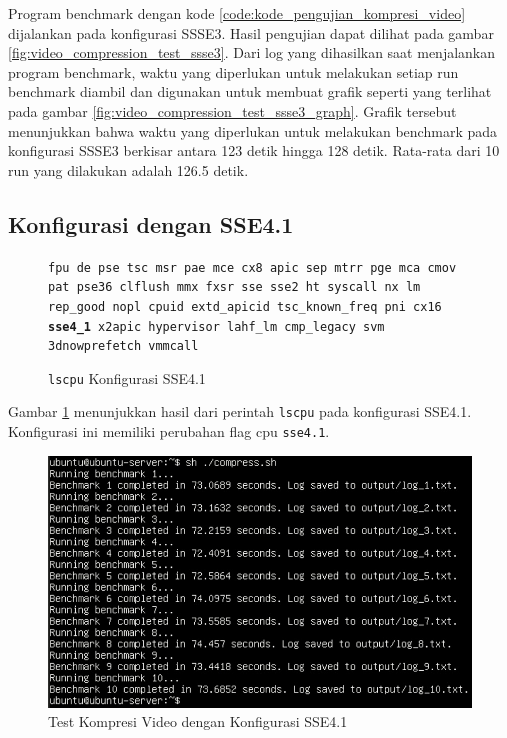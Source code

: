 Program benchmark dengan kode \ref{code:kode_pengujian_kompresi_video} dijalankan pada konfigurasi SSSE3. Hasil pengujian dapat dilihat pada gambar \ref{fig:video_compression_test_ssse3}. Dari log yang dihasilkan saat menjalankan program benchmark, waktu yang diperlukan untuk melakukan setiap run benchmark diambil dan digunakan untuk membuat grafik seperti yang terlihat pada gambar \ref{fig:video_compression_test_ssse3_graph}. Grafik tersebut menunjukkan bahwa waktu yang diperlukan untuk melakukan benchmark pada konfigurasi SSSE3 berkisar antara 123 detik hingga 128 detik. Rata-rata dari 10 run yang dilakukan adalah 126.5 detik.

\subsection{Konfigurasi dengan SSE4.1}
\begin{figure}
    \texttt{fpu de pse tsc msr pae mce cx8 apic sep mtrr pge mca cmov pat pse36 clflush mmx fxsr sse sse2 ht syscall nx lm rep\_good nopl cpuid extd\_apicid tsc\_known\_freq pni cx16 \textbf{sse4\_1} x2apic hypervisor lahf\_lm cmp\_legacy svm 3dnowprefetch vmmcall}
    \caption{\texttt{lscpu} Konfigurasi SSE4.1}
    \label{fig:lscpu_video_compression_test_sse4.1}
\end{figure}

Gambar \ref{fig:lscpu_video_compression_test_sse4.1} menunjukkan hasil dari perintah \texttt{lscpu} pada konfigurasi SSE4.1. Konfigurasi ini memiliki perubahan flag cpu \texttt{sse4.1}.

\begin{figure}
    \centering
    \includegraphics[width=1\textwidth]
    {assets/pics/video-compression-test/sse4.1.jpeg}
    \caption{Test Kompresi Video dengan Konfigurasi SSE4.1}
    \label{fig:video_compression_test_sse4.1}
\end{figure}

